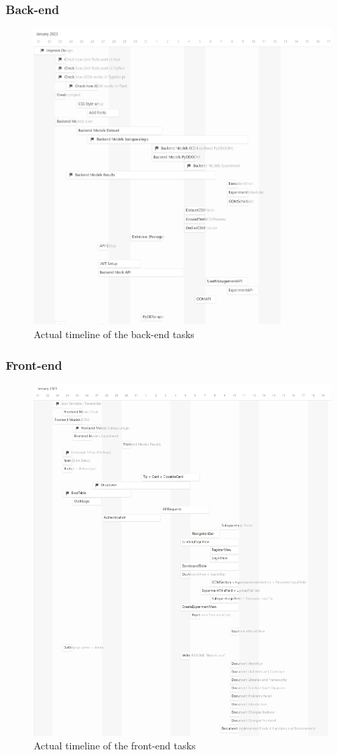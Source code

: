 \subsubsection*{Back-end}
\begin{figure}[!ht]
    \centering
    \includegraphics[width=\textwidth]{images/timeline-actual-backend.png}
    \caption{Actual timeline of the back-end tasks}
    \label{fig:timeline-actual-backend}
\end{figure}
\clearpage

\subsubsection*{Front-end}
\begin{figure}[!ht]
    \centering
    \includegraphics[width=\textwidth]{images/timeline-actual-frontend.png}
    \caption{Actual timeline of the front-end tasks}
    \label{fig:timeline-actual-frontend}
\end{figure}
\clearpage
